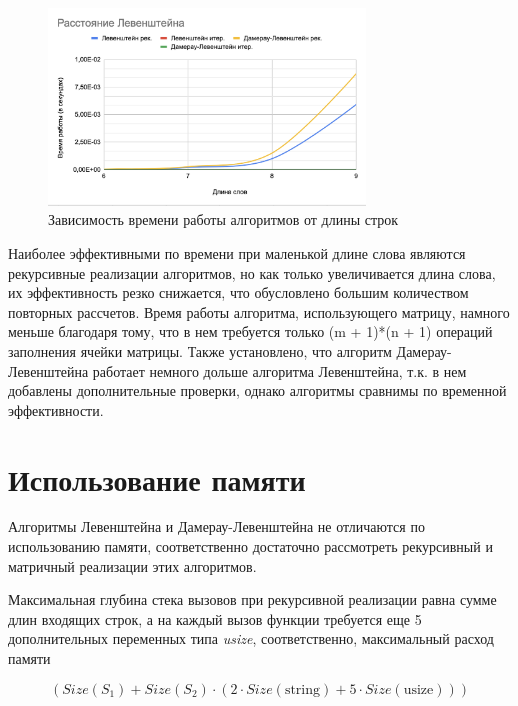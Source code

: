 \documentclass[12pt]{report}
\begin{document}
	
	\begin{figure}[ht]
		\centering
		\includegraphics[width=0.75\textwidth]{plot.png}
		\caption{Зависимость времени работы алгоритмов от длины строк}
		\label{fig:plot}
	\end{figure}

	Наиболее эффективными по времени при маленькой длине слова являются рекурсивные реализации алгоритмов, но как только увеличивается длина слова, их эффективность резко снижается, что обусловлено большим количеством повторных рассчетов. Время работы алгоритма, использующего матрицу, намного меньше благодаря тому, что в нем требуется только (m + 1)*(n + 1) операций заполнения ячейки матрицы. Также установлено, что алгоритм Дамерау-Левенштейна работает немного дольше алгоритма Левенштейна, т.к. в нем добавлены дополнительные проверки, однако алгоритмы сравнимы по временной эффективности.

	\section{Использование памяти}

	\par
	Алгоритмы Левенштейна и Дамерау-Левенштейна не отличаются по использованию памяти, соответственно достаточно рассмотреть рекурсивный и матричный реализации этих алгоритмов.

	\par
	Максимальная глубина стека вызовов при рекурсивной реализации равна сумме длин входящих строк, а на каждый вызов функции требуется еще 5 дополнительных переменных типа \textit{usize}, соответственно, максимальный расход памяти

	\begin{equation}
		(Size(S_{1}) + Size(S_{2}) \cdot (2 \cdot Size(\text{string}) + 5 \cdot Size(\text{usize})))
	\end{equation}
	
\end{document}
